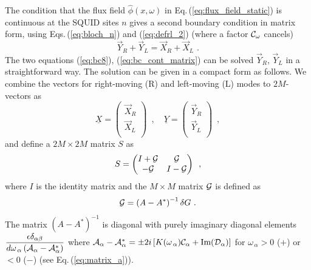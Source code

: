 % 
The condition that the flux field $\hat{\phi}(x,\omega)$ in Eq.\,(\ref{eq:flux_field_static})
is continuous at the SQUID sites $n$ gives a second boundary condition in matrix form, 
using Eqs.\,(\ref{eq:bloch_n}) and (\ref{eq:defrl_2}) (where a factor ${\cal C}_{\omega}$ cancels)
%
\begin{equation} \label{eq:bc_cont_matrix}
\vec{Y}_R + \vec{Y}_L = \vec{X}_R + \vec{X}_L \, \, .
\end{equation}
%
The two equations (\ref{eq:bc8}), (\ref{eq:bc_cont_matrix}) can be solved $\vec{Y}_R$, $\vec{Y}_L$
in a straightforward way. The solution can be given in a compact form as follows. 
We combine the vectors for right-moving (R) and left-moving (L) modes to $2M$-vectors as
%
\begin{equation} \label{eq:x_comp}
\underline{X} = 
\begin{pmatrix}
\vec{X}_R \\
\vec{X}_L \\
\end{pmatrix} \, \, \, , \quad
\underline{Y} = 
\begin{pmatrix}
\vec{Y}_R \\
\vec{Y}_L \\
\end{pmatrix} \, \, \, ,
\end{equation}
%
and define a $2M \times 2M$ matrix $S$ as
%
%
\begin{equation} \label{eq:matrix_s}
S =
\begin{pmatrix}
I + {\cal G} & {\cal G} \\
-{\cal G} & I - {\cal G} \\
\end{pmatrix} \, \, \, ,
\end{equation}
%
where $I$ is the identity matrix and the $M \times M$ matrix ${\cal G}$ is defined as
%
\begin{equation} \label{eq:matrix_G}
{\cal G} = \left( A - A^* \right)^{-1} \delta G \, \, .
\end{equation}
%
The matrix $\left( A - A^* \right)^{-1}$ is diagonal with purely imaginary diagonal elements 
$\displaystyle{\frac{\epsilon \delta_{\alpha \beta}}{d \omega_{\,\alpha} \left({\cal{A}}_{\alpha}
- {\cal{A}}_{\alpha}^* \right)}}$
where \newline
${\cal A}_{\alpha} - {\cal A}_{\alpha}^* = \pm 2 i \left[ K(\omega_{\,\alpha}) {\cal C}_{\alpha} 
+ \text{Im}( {\cal D}_{\alpha}) \right]$ for $\omega_{\,\alpha} > 0$ ($+$) or $<0$ ($-$) 
(see Eq.\,(\ref{eq:matrix_a})). 
%
